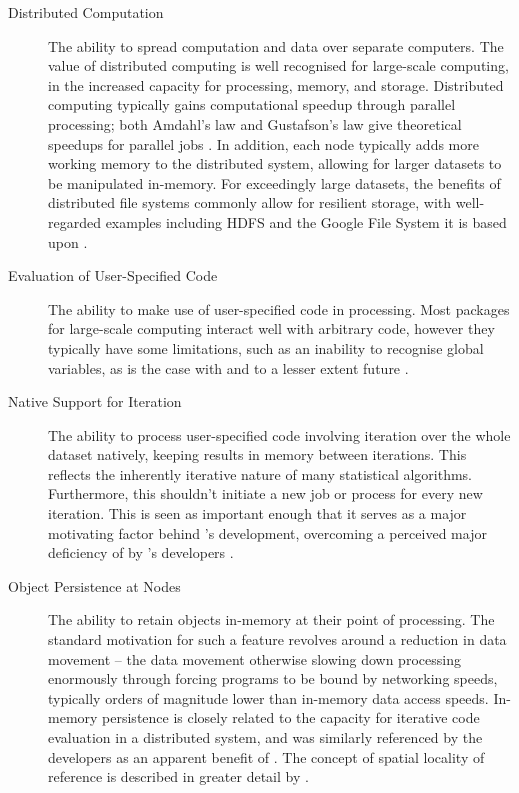 \begin{description} \item[Distributed Computation] The ability to spread computation and data over separate computers.
		The value of distributed computing is well recognised for large-scale computing, in the increased capacity for processing, memory, and storage.
		Distributed computing typically gains computational speedup through parallel processing; both Amdahl's law and Gustafson's law give theoretical speedups for parallel jobs \cites{amdahl1967law,gustafson1988law}.
		In addition, each node typically adds more working memory to the distributed system, allowing for larger datasets to be manipulated in-memory.
		For exceedingly large datasets, the benefits of distributed file systems commonly allow for resilient storage, with well-regarded examples including HDFS and the Google File System it is based upon \cites{shvachko2010hadoop,ghemawat2003google}.
	\item[Evaluation of User-Specified Code]
		The ability to make use of user-specified code in processing.
		Most \R{} packages for large-scale computing interact well with arbitrary code, however they typically have some limitations, such as an inability to recognise global variables, as is the case with  and to a lesser extent future \cites{sparklyr2020limitations,microsoft20}.
	\item[Native Support for Iteration]
		The ability to process user-specified code involving iteration over the
		whole dataset natively, keeping results in memory between iterations.
		This reflects the inherently iterative nature of many statistical algorithms.
		Furthermore, this shouldn't initiate a new job or process for every new iteration.
		This is seen as important enough that it serves as a major motivating factor behind 's development, overcoming a perceived major deficiency of  by 's developers \cite{zaharia2010spark}.
	\item[Object Persistence at Nodes]
		The ability to retain objects in-memory at their point of processing.
		The standard motivation for such a feature revolves around a reduction in data movement -- the data movement otherwise slowing down processing enormously through forcing programs to be bound by networking speeds, typically orders of magnitude lower than in-memory data access speeds.
	In-memory persistence is closely related to the capacity for iterative code evaluation in a distributed system, and was similarly referenced by the  developers as an apparent benefit of \cite{zaharia2010spark}. The concept of spatial locality of reference is described in greater detail by \textcite{denning2005locality}.

\end{description}

